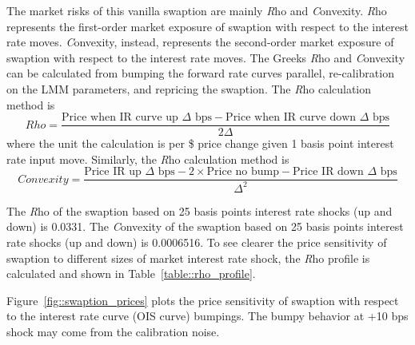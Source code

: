 The market risks of this vanilla swaption are mainly {\emph Rho} and {\emph Convexity}. {\emph Rho} represents the first-order market exposure of swaption with respect to the interest rate moves. {\emph Convexity}, instead, represents the second-order market exposure of swaption with respect to the interest rate moves. The Greeks {\emph Rho} and {\emph Convexity} can be calculated from bumping the forward rate curves parallel, re-calibration on the LMM parameters, and repricing the swaption. The {\emph Rho} calculation method is
$$
Rho = \frac{\textrm{Price when IR curve up $\Delta$ bps} - \textrm{Price when IR curve down $\Delta$ bps}}{2\Delta}
$$
where the unit the calculation is per \$ price change given 1 basis point interest rate input move. Similarly, the {\emph Rho} calculation method is
$$
Convexity = \frac{\textrm{Price IR up $\Delta$ bps} - 2\times\textrm{Price no bump} - \textrm{Price IR down $\Delta$ bps}}{\Delta^2}
$$

The {\emph Rho} of the swaption based on 25 basis points interest rate shocks (up and down) is 0.0331. The {\emph Convexity} of the swaption based on 25 basis points interest rate shocks (up and down) is 0.0006516. To see clearer the price sensitivity of swaption to different sizes of market interest rate shock, the {\emph Rho} profile is calculated and shown in Table~\ref{table::rho_profile}.

\begin{center}
\label{table::rho_profile}
\end{center}

Figure~\ref{fig::swaption_prices} plots the price sensitivity of swaption with respect to the interest rate curve (OIS curve) bumpings. The bumpy behavior at +10 bps shock may come from the calibration noise. 

